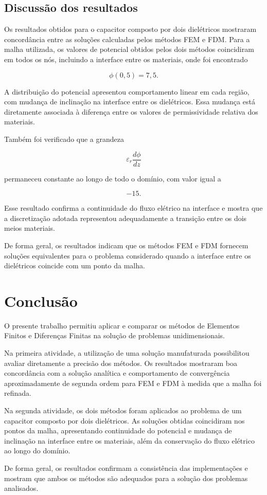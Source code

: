 \subsection{Discussão dos resultados}

Os resultados obtidos para o capacitor composto por dois dielétricos mostraram concordância entre as soluções calculadas pelos métodos FEM e FDM. Para a malha utilizada, os valores de potencial obtidos pelos dois métodos coincidiram em todos os nós, incluindo a interface entre os materiais, onde foi encontrado

\[
\phi(0{,}5)=7{,}5.
\]

A distribuição do potencial apresentou comportamento linear em cada região, com mudança de inclinação na interface entre os dielétricos. Essa mudança está diretamente associada à diferença entre os valores de permissividade relativa dos materiais.

Também foi verificado que a grandeza

\[
\varepsilon_r\frac{d\phi}{dz}
\]

permaneceu constante ao longo de todo o domínio, com valor igual a

\[
-15.
\]

Esse resultado confirma a continuidade do fluxo elétrico na interface e mostra que a discretização adotada representou adequadamente a transição entre os dois meios materiais.

De forma geral, os resultados indicam que os métodos FEM e FDM fornecem soluções equivalentes para o problema considerado quando a interface entre os dielétricos coincide com um ponto da malha.

\section{Conclusão}

O presente trabalho permitiu aplicar e comparar os métodos de Elementos Finitos e Diferenças Finitas na solução de problemas unidimensionais.

Na primeira atividade, a utilização de uma solução manufaturada possibilitou avaliar diretamente a precisão dos métodos. Os resultados mostraram boa concordância com a solução analítica e comportamento de convergência aproximadamente de segunda ordem para FEM e FDM à medida que a malha foi refinada.

Na segunda atividade, os dois métodos foram aplicados ao problema de um capacitor composto por dois dielétricos. As soluções obtidas coincidiram nos pontos da malha, apresentando continuidade do potencial e mudança de inclinação na interface entre os materiais, além da conservação do fluxo elétrico ao longo do domínio.

De forma geral, os resultados confirmam a consistência das implementações e mostram que ambos os métodos são adequados para a solução dos problemas analisados.
